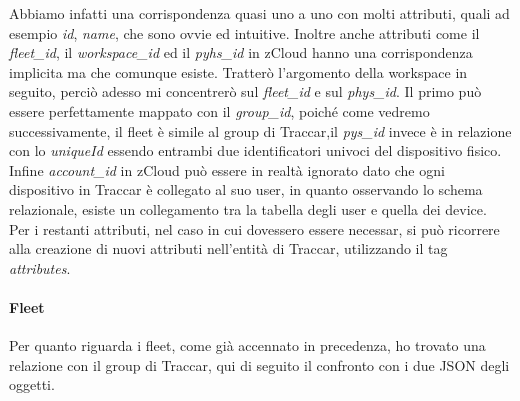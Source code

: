 \documentclass[a4paper,titlepage,12pt]{book}
\begin{document}
Abbiamo infatti una corrispondenza quasi uno a uno con molti attributi, quali ad esempio \textit{id}, \textit{name}, che sono ovvie ed intuitive. Inoltre anche attributi come il \textit{fleet\_id}, il \textit{workspace\_id} ed il \textit{pyhs\_id} in zCloud hanno una corrispondenza implicita ma che comunque esiste. Tratterò l'argomento della workspace in seguito,  perciò adesso mi concentrerò sul \textit{fleet\_id} e sul \textit{phys\_id}. Il primo può essere perfettamente mappato con il \textit{group\_id}, poiché come vedremo successivamente, il fleet è simile al group di Traccar,il \textit{pys\_id} invece è in relazione con lo \textit{uniqueId} essendo entrambi due identificatori univoci del dispositivo fisico. Infine \textit{account\_id} in zCloud può essere in realtà ignorato dato che ogni dispositivo in Traccar è collegato al suo user, in quanto osservando lo schema relazionale, esiste un collegamento tra la tabella degli user e quella dei device.\\
Per i restanti attributi, nel caso in cui dovessero essere necessar, si può ricorrere alla creazione di nuovi attributi nell'entità di Traccar, utilizzando il tag \textit{attributes}.

\paragraph{
\sffamily Fleet}
Per quanto riguarda i fleet, come già accennato in precedenza, ho trovato una relazione con il group di Traccar, qui di seguito il confronto con i due JSON degli oggetti.
\end{document}
